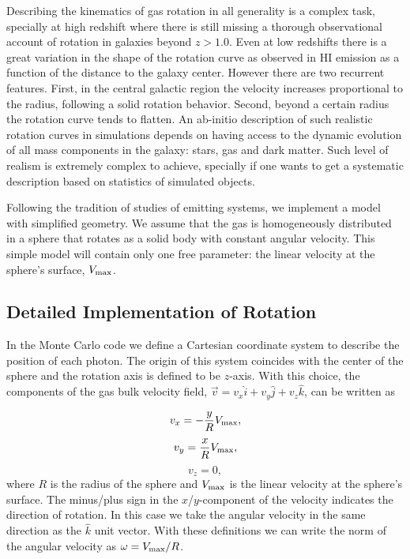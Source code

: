 \documentclass{emulateapj}
\newcommand{\ly}{{\ifmmode{{\rm Ly}\alpha~}\else{Ly$\alpha$~}\fi}}
\begin{document}
Describing the kinematics of gas rotation in all generality is a
complex task, specially at high redshift where there is still missing
a thorough observational account of rotation in galaxies beyond
$z>1.0$. Even at low redshifts there is a great
variation in the shape of the rotation curve as observed in HI
emission as a function of the distance to the galaxy center. However
there are two recurrent features. First, in the
central galactic region the velocity increases proportional to the radius,
following a solid rotation behavior. Second, beyond a certain radius
the rotation curve tends to flatten.  An ab-initio description of
such realistic rotation curves in simulations depends on having access to
the dynamic evolution of all mass components in the galaxy: stars, gas
and dark matter. Such level of realism is extremely complex to
achieve, specially if one wants to get a systematic description based
on statistics of simulated objects. 

Following the tradition of studies of \ly emitting systems,
we implement a model with simplified geometry. We assume that the gas
is homogeneously distributed in a sphere that rotates as a solid body
with constant angular velocity. This simple model will contain only
one free parameter: the linear velocity at the sphere's surface, $V_{\rm
  max}$. 

\subsection{Detailed Implementation of Rotation}

 In the Monte Carlo code we define a Cartesian coordinate system to
 describe the position of each photon. The origin of this system
 coincides with the center of the sphere and the rotation axis is defined
 to be $z$-axis. With this choice, the components of the gas bulk velocity
 field, $\vec{v} = v_{x}\hat{i} + v_{y}\hat{j} + v_{z}\hat{k}$, can be
 written as  
  
\begin{equation}
    v_{x}=-\frac{y}{R}V_{\rm max}, \label{subeq1}
\end{equation}
\begin{equation}
    v_{y}=\frac{x}{R}V_{\rm max}, \label{subeq2}
\end{equation}
\begin{equation}
    v_{z}=0, \label{subeq3}
\end{equation}
%
where $R$ is the radius of the sphere and $V_{\rm max}$ is the linear
velocity at the sphere's surface. The minus/plus sign in the
$x$/$y$-component of the velocity indicates the direction of
rotation. In this case we take the angular velocity in the same
direction as the $\hat{k}$ unit vector. With these definitions we can
write the norm of the angular velocity as $\omega=V_{\rm max}/R$.  
\end{document}
